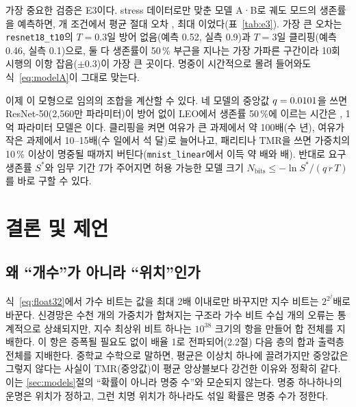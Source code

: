 \documentclass[11pt,a4paper]{article}
\newcommand{\code}[1]{\texttt{#1}}
\begin{document}
\begin{table}[!htb]
  \centering\scriptsize
  \caption{적합된 파라미터. $k_{50}^{A}=\ln2/q$, MAE는 stress 데이터에서의 생존률 평균 절대 오차, $T_{50}$ 예측은 $r=10^{-6}$/bit/day. $k_{50}^{A}$와 $T_{50}$ 예측은 곡선 전체에 맞춘 값이라 두 점 사이를 보간한 표~\ref{tab:models}의 값(\code{mnist\_linear} \KhalfNoneLinear{}개, \DaysNoneLinear{})과 다르다. 클리핑의 $k_{50}^{B}$는 E1의 13단계로 맞춘 값이며, 고선량 3단계를 더한 E5(표~\ref{tab:e5})에서는 5{,}085이다.}
  \label{tab:fit}
  
\end{table}

가장 중요한 검증은 E3이다. stress 데이터로만 맞춘 모델 A·B로 궤도 모드의 생존률을 예측하면, \EthreeN{}개 조건에서 평균 절대 오차 \EthreeMAE{}, 최대 \EthreeMaxErr{}이었다(표~\ref{tab:e3}). 가장 큰 오차는 \code{resnet18\_t10}의 $T=0.3$일 방어 없음(예측 0.52, 실측 0.9)과 $T=3$일 클리핑(예측 0.46, 실측 0.1)으로, 둘 다 생존률이 50\,\% 부근을 지나는 가장 가파른 구간이라 10회 시행의 이항 잡음($\pm0.3$)이 가장 큰 곳이다. 명중이 시간적으로 몰려 들어와도 식~\eqref{eq:modelA}이 그대로 맞는다.

이제 이 모형으로 임의의 조합을 계산할 수 있다. 네 모델의 중앙값 $q=0.0101$을 쓰면 ResNet-50(2{,}560만 파라미터)이 방어 없이 LEO에서 생존률 50\,\%에 이르는 시간은 \TfiftyResnetFifty{}, 1억 파라미터 모델은 \TfiftyHundredMMin{}이다. 클리핑을 켜면 여유가 큰 과제에서 약 100배(수 년), 여유가 작은 과제에서 10--15배(수 일에서 석 달)로 늘어나고, 패리티나 TMR을 쓰면 가중치의 10\,\% 이상이 명중될 때까지 버틴다(\code{mnist\_linear}에서 이득 약 \GainETmr{}배와 \GainEParity{}배). 반대로 요구 생존률 $S^\ast$와 임무 기간 $T$가 주어지면 허용 가능한 모델 크기 $N_{\mathrm{bits}}\le-\ln S^\ast/(q\,r\,T)$를 바로 구할 수 있다.


\section{결론 및 제언}

\subsection{왜 ``개수''가 아니라 ``위치''인가}
식~\eqref{eq:float32}에서 가수 비트는 값을 최대 2배 이내로만 바꾸지만 지수 비트는 $2^{2^{j}}$배로 바꾼다. 신경망은 수천 개의 가중치가 합쳐지는 구조라 가수 비트 수십 개의 오류는 통계적으로 상쇄되지만, 지수 최상위 비트 하나는 $10^{38}$ 크기의 항을 만들어 합 전체를 지배한다. 이 항은 증폭될 필요도 없이 배율 1로 전파되어(2.2절) 다음 층의 합과 출력층 전체를 지배한다. 중학교 수학으로 말하면, 평균은 이상치 하나에 끌려가지만 중앙값은 그렇지 않다는 사실이 TMR(중앙값)이 평균 앙상블보다 강건한 이유와 정확히 같다. 이는 \ref{sec:models}절의 ``확률이 아니라 명중 수''와 모순되지 않는다. 명중 하나하나의 운명은 위치가 정하고, 그런 치명 위치가 하나라도 섞일 확률은 명중 수가 정한다.
\end{document}
